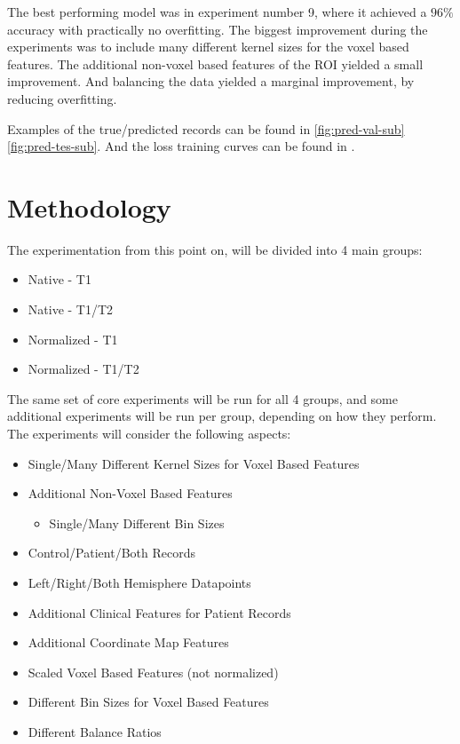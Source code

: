 The best performing model was in experiment number 9, where it achieved a $96\%$ accuracy with practically no overfitting. The biggest improvement during the experiments was to include many different kernel sizes for the voxel based features. The additional non-voxel based features of the ROI yielded a small improvement. And balancing the data yielded a marginal improvement, by reducing overfitting.\par
Examples of the true/predicted records can be found in  \ref{fig:pred-val-sub} \ref{fig:pred-tes-sub}. And the loss training curves can be found in .

\section{Methodology}

The experimentation from this point on, will be divided into 4 main groups:
\begin{itemize}
  \item Native - T1
  \item Native - T1/T2
  \item Normalized - T1
  \item Normalized - T1/T2
\end{itemize}
The same set of core experiments will be run for all 4 groups, and some additional experiments will be run per group, depending on how they perform. The experiments will consider the following aspects:
\begin{itemize}
  \item Single/Many Different Kernel Sizes for Voxel Based Features
  \item Additional Non-Voxel Based Features
  \begin{itemize}
    \item Single/Many Different Bin Sizes
  \end{itemize}
  \item Control/Patient/Both Records
  \item Left/Right/Both Hemisphere Datapoints
  \item Additional Clinical Features for Patient Records
  \item Additional Coordinate Map Features
  \item Scaled Voxel Based Features (not normalized)
  \item Different Bin Sizes for Voxel Based Features
  \item Different Balance Ratios
\end{itemize}

